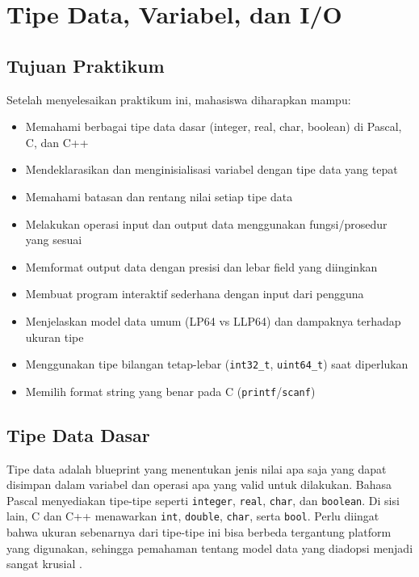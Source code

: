 \documentclass[../main.tex]{subfiles}
\begin{document}
\chapter{Tipe Data, Variabel, dan I/O}

\section*{Tujuan Praktikum}
Setelah menyelesaikan praktikum ini, mahasiswa diharapkan mampu:
\begin{itemize}
  \item Memahami berbagai tipe data dasar (integer, real, char, boolean) di Pascal, C, dan C++
  \item Mendeklarasikan dan menginisialisasi variabel dengan tipe data yang tepat
  \item Memahami batasan dan rentang nilai setiap tipe data
  \item Melakukan operasi input dan output data menggunakan fungsi/prosedur yang sesuai
  \item Memformat output data dengan presisi dan lebar field yang diinginkan
  \item Membuat program interaktif sederhana dengan input dari pengguna
  \item Menjelaskan model data umum (LP64 vs LLP64) dan dampaknya terhadap ukuran tipe
  \item Menggunakan tipe bilangan tetap-lebar (\texttt{int32\_t}, \texttt{uint64\_t}) saat diperlukan \parencite{c-std-integer-types}
  \item Memilih format string yang benar pada C (\texttt{printf}/\texttt{scanf}) \parencite{c-printf,c-scanf}
\end{itemize}

\section{Tipe Data Dasar}
Tipe data adalah blueprint yang menentukan jenis nilai apa saja yang dapat disimpan dalam variabel dan operasi apa yang valid untuk dilakukan. Bahasa Pascal menyediakan tipe-tipe seperti \texttt{integer}, \texttt{real}, \texttt{char}, dan \texttt{boolean}. Di sisi lain, C dan C++ menawarkan \texttt{int}, \texttt{double}, \texttt{char}, serta \texttt{bool}. Perlu diingat bahwa ukuran sebenarnya dari tipe-tipe ini bisa berbeda tergantung platform yang digunakan, sehingga pemahaman tentang model data yang diadopsi menjadi sangat krusial \parencite{pascal-tutorial-wikibooks,iso-c-draft-n1570,cpp-arithmetic-types,cpp-fundamental-types}.
\end{document}

